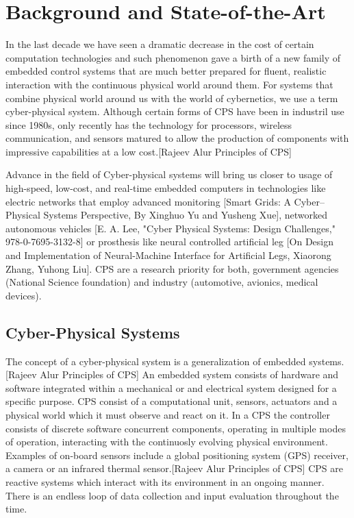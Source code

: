 \chapter{Background and State-of-the-Art}
\label{chap.stateoftheart}

In the last decade we have seen a dramatic decrease in the cost of certain computation technologies and such phenomenon gave a birth of a new family of embedded control systems that are much better prepared for fluent, realistic interaction with the continuous physical world around them. For systems that combine physical world around us with the world of cybernetics, we use a term cyber-physical system. Although certain forms of CPS have been in industril use since 1980s, only recently has the technology for processors, wireless communication, and sensors matured to allow the production of components with impressive capabilities at a low cost.[Rajeev Alur Principles of CPS] 

Advance in the field of Cyber-physical systems will bring us closer to usage of high-speed, low-cost, and real-time embedded computers in technologies like electric networks that employ advanced monitoring [Smart Grids: A Cyber–Physical Systems Perspective, By Xinghuo Yu and Yusheng Xue], networked autonomous vehicles [E. A. Lee, "Cyber Physical Systems: Design Challenges," 978-0-7695-3132-8] or prosthesis like neural controlled artificial leg [On Design and Implementation of Neural-Machine Interface for Artificial Legs, Xiaorong Zhang, Yuhong Liu]. CPS are a research priority for both, government agencies (National Science foundation) and industry (automotive, avionics, medical devices).

\section{Cyber-Physical Systems}

The concept of a cyber-physical system is a generalization of embedded systems.[Rajeev Alur Principles of CPS] An embedded system consists of hardware and software integrated within a mechanical or and electrical system designed for a specific purpose. CPS consist of a computational unit, sensors, actuators and a physical world which it must observe and react on it. In a CPS the controller consists of discrete software concurrent components, operating in multiple modes of operation, interacting with the continuosly evolving physical environment. Examples of on-board sensors include a global positioning system (GPS) receiver, a camera or an infrared thermal sensor.[Rajeev Alur Principles of CPS] CPS are reactive systems which interact with its environment in an ongoing manner. There is an endless loop of data collection and input evaluation throughout the time.

